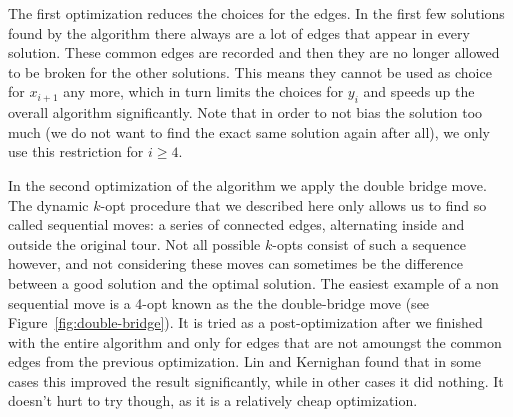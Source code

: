 \documentclass[12pt]{article}
\begin{document}
    The first optimization reduces the choices for the edges. In the first few solutions found by
    the algorithm there always are a lot of edges that appear in every solution. These common edges
    are recorded and then they are no longer allowed to be broken for the other solutions. This
    means they cannot be used as choice for $x_{i+1}$ any more, which in turn limits the choices for
    $y_i$ and speeds up the overall algorithm significantly. Note that in order to not bias the
    solution too much (we do not want to find the exact same solution again after all), we only use
    this restriction for $i \geq 4$.

    In the second optimization of the algorithm we apply the double bridge move.
    The dynamic $k$-opt procedure that we described here only allows us to find so called sequential
    moves: a series of connected edges, alternating inside and outside the original tour. Not all
    possible $k$-opts consist of such a sequence however, and not considering these moves can
    sometimes be the difference between a good solution and the optimal solution. The easiest
    example of a non sequential move is a 4-opt known as the the double-bridge move (see
    Figure~\ref{fig:double-bridge}).
    It is tried as a post-optimization after we finished with the entire algorithm and only for
    edges that are not amoungst the common edges from the previous optimization. Lin and Kernighan
    found that in some cases this improved the result significantly, while in other cases it did
    nothing. It doesn't hurt to try though, as it is a relatively cheap optimization.

\end{document}
